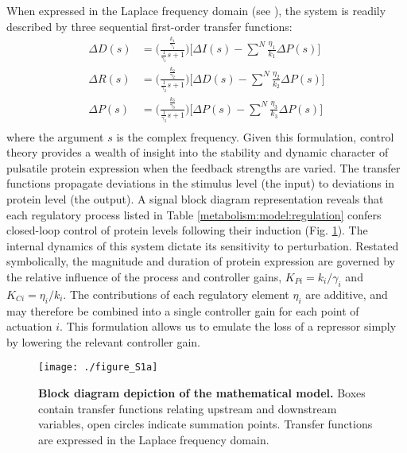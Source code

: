 When expressed in the Laplace frequency domain (see \cite{Seborg2011}), the system is readily described by three sequential first-order transfer functions:
\begin{equation}
\begin{aligned}
\Delta D(s) &= \Big( \frac{\frac{k_1}{\gamma_1}}{\frac{1}{\gamma_1}s+1} \Big) \Big [\Delta I(s) - \sum\limits_{}^{N} \frac{\eta_{1}}{k_1}\Delta P(s) \Big ] \\
\Delta R(s) &= \Big( \frac{\frac{k_2}{\gamma_2}}{\frac{1}{\gamma_2}s+1} \Big) \Big [\Delta D(s) - \sum\limits_{}^{N} \frac{\eta_{2}}{k_2}\Delta P(s) \Big ] \\
\Delta P(s) &= \Big( \frac{\frac{k_3}{\gamma_3}}{\frac{1}{\gamma_3}s+1} \Big) \Big [\Delta P(s) - \sum\limits_{}^{N} \frac{\eta_{3}}{k_3}\Delta P(s) \Big ] \\
\end{aligned}
\end{equation}
where the argument $s$ is the complex frequency. Given this formulation, control theory provides a wealth of insight into the stability and dynamic character of pulsatile protein expression when the feedback strengths are varied. The transfer functions propagate deviations in the stimulus level (the input) to deviations in protein level (the output). A signal block diagram representation reveals that each regulatory process listed in Table \ref{metabolism:model:regulation} confers closed-loop control of protein levels following their induction (Fig. \ref{fig:metabolism:figS1a}). The internal dynamics of this system dictate its sensitivity to perturbation. Restated symbolically, the magnitude and duration of protein expression are governed by the relative influence of the process and controller gains, $K_{Pi} = k_i/\gamma_i$  and $K_{Ci} = \eta_i/k_i$. The contributions of each regulatory element $\eta_i$ are additive, and may therefore be combined into a single controller gain for each point of actuation $i$. This formulation allows us to emulate the loss of a repressor simply by lowering the relevant controller gain.

\begin{figure}[h!]
\centering
\texttt{[image: ./figure\_S1a]}
\caption[Block diagram depiction of the mathematical model.]{\textbf{Block diagram depiction of the mathematical model.} Boxes contain transfer functions relating upstream and downstream variables, open circles indicate summation points. Transfer functions are expressed in the Laplace frequency domain.}
\label{fig:metabolism:figS1a}
\end{figure}

